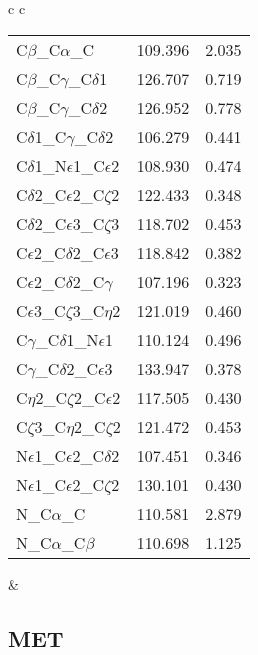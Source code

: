 \begin{longtable}{ c c }
\begin{tabular}{ l l l }
  C$\beta$\_C$\alpha$\_C & 109.396 & 2.035\\
  C$\beta$\_C$\gamma$\_C$\delta$1 & 126.707 & 0.719\\
  C$\beta$\_C$\gamma$\_C$\delta$2 & 126.952 & 0.778\\
  C$\delta$1\_C$\gamma$\_C$\delta$2 & 106.279 & 0.441\\
  C$\delta$1\_N$\epsilon$1\_C$\epsilon$2 & 108.930 & 0.474\\
  C$\delta$2\_C$\epsilon$2\_C$\zeta$2 & 122.433 & 0.348\\
  C$\delta$2\_C$\epsilon$3\_C$\zeta$3 & 118.702 & 0.453\\
  C$\epsilon$2\_C$\delta$2\_C$\epsilon$3 & 118.842 & 0.382\\
  C$\epsilon$2\_C$\delta$2\_C$\gamma$ & 107.196 & 0.323\\
  C$\epsilon$3\_C$\zeta$3\_C$\eta$2 & 121.019 & 0.460\\
  C$\gamma$\_C$\delta$1\_N$\epsilon$1 & 110.124 & 0.496\\
  C$\gamma$\_C$\delta$2\_C$\epsilon$3 & 133.947 & 0.378\\
  C$\eta$2\_C$\zeta$2\_C$\epsilon$2 & 117.505 & 0.430\\
  C$\zeta$3\_C$\eta$2\_C$\zeta$2 & 121.472 & 0.453\\
  N$\epsilon$1\_C$\epsilon$2\_C$\delta$2 & 107.451 & 0.346\\
  N$\epsilon$1\_C$\epsilon$2\_C$\zeta$2 & 130.101 & 0.430\\
  N\_C$\alpha$\_C & 110.581 & 2.879\\
  N\_C$\alpha$\_C$\beta$ & 110.698 & 1.125\\
  \bottomrule
  \end{tabular}
  &
  \\
  
\end{longtable}    

\newpage
\subsection{MET}

